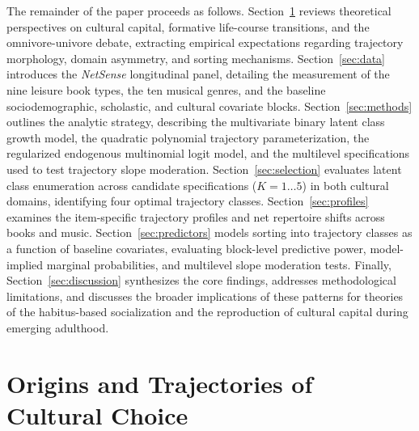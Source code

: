 \documentclass[12pt]{article}
\begin{document}
The remainder of the paper proceeds as follows. Section~\ref{sec:lit} reviews theoretical perspectives on cultural capital, formative life-course transitions, and the omnivore-univore debate, extracting empirical expectations regarding trajectory morphology, domain asymmetry, and sorting mechanisms. Section~\ref{sec:data} introduces the \textit{NetSense} longitudinal panel, detailing the measurement of the nine leisure book types, the ten musical genres, and the baseline sociodemographic, scholastic, and cultural covariate blocks. Section~\ref{sec:methods} outlines the analytic strategy, describing the multivariate binary latent class growth model, the quadratic polynomial trajectory parameterization, the regularized endogenous multinomial logit model, and the multilevel specifications used to test trajectory slope moderation. Section~\ref{sec:selection} evaluates latent class enumeration across candidate specifications ($K = 1 \dots 5$) in both cultural domains, identifying four optimal trajectory classes. Section~\ref{sec:profiles} examines the item-specific trajectory profiles and net repertoire shifts across books and music. Section~\ref{sec:predictors} models sorting into trajectory classes as a function of baseline covariates, evaluating block-level predictive power, model-implied marginal probabilities, and multilevel slope moderation tests. Finally, Section~\ref{sec:discussion} synthesizes the core findings, addresses methodological limitations, and discusses the broader implications of these patterns for theories of the habitus-based socialization and the reproduction of cultural capital during emerging adulthood.

\section{Origins and Trajectories of Cultural Choice}\label{sec:lit}
\end{document}
